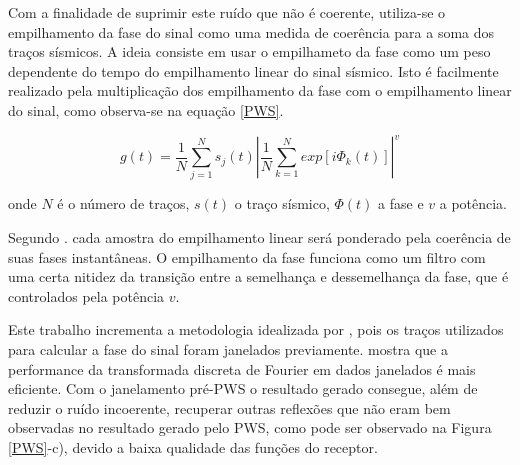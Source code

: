Com a finalidade de suprimir este ruído que não é coerente, utiliza-se o empilhamento da fase do sinal como uma medida de coerência para a soma dos traços sísmicos. A ideia consiste em usar o empilhameto da fase como um peso dependente do tempo do empilhamento linear do sinal sísmico. Isto é facilmente realizado pela multiplicação dos empilhamento da fase com o empilhamento linear do sinal, como observa-se na equação \ref{PWS}.

\begin{equation}
\label{PWS}
g(t) = \frac{1}{N} \sum_{j=1}^{N}s_{j}(t)\left | \frac{1}{N} \sum_{k=1}^{N}exp\left [ i\Phi _{k}(t) \right ]  \right |^{v}
\end{equation}

onde $N$ é o número de traços, $s(t)$ o traço sísmico, $\Phi (t)$ a fase e $v$ a potência. 

Segundo \cite{schimmel_noise_1997} . cada amostra do empilhamento linear será ponderado pela coerência de suas fases instantâneas. O empilhamento da fase funciona como um filtro com uma certa nitidez da transição entre a semelhança e dessemelhança da fase, que é
controlados pela potência $v$. 

Este trabalho incrementa a metodologia idealizada por \cite{schimmel_noise_1997}, pois os traços utilizados para calcular a fase do sinal foram janelados previamente. \cite{harris_use_1978} mostra que a performance da transformada discreta de Fourier em dados janelados é mais eficiente. Com o janelamento pré-PWS o resultado gerado consegue, além de reduzir o ruído incoerente, recuperar outras reflexões que não eram bem observadas no resultado gerado pelo PWS, como pode ser observado na Figura \ref{PWS}-c), devido a baixa qualidade das funções do receptor.

